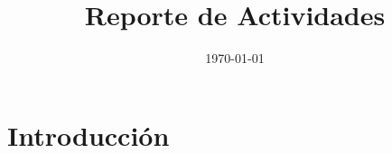 \documentclass[]{style}
\begin{document}
\title{Reporte de Actividades}
\date{\today}
\maketitle

\section{Introducción}
\end{document}
